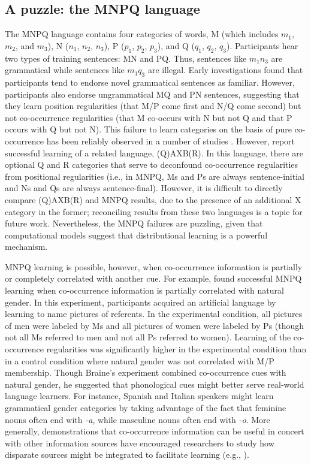 \documentclass[man,floatsintext]{apa6}
\begin{document}
\subsection{A puzzle: the MNPQ language}

The MNPQ language contains four categories of words, M (which includes $m_1$, $m_2$, and $m_3$), N ($n_1$, $n_2$, $n_3$), P ($p_1$, $p_2$, $p_3$), and Q ($q_1$, $q_2$, $q_3$). Participants hear two types of training sentences: MN and PQ. Thus, sentences like $m_1 n_3$ are grammatical while sentences like $m_1 q_3$ are illegal. Early investigations \citep{braine1966, smith1966} found that participants tend to endorse novel grammatical sentences as familiar. However, participants also endorse ungrammatical MQ and PN sentences, suggesting that they learn position regularities (that M/P come first and N/Q come second) but not co-occurrence regularities (that M co-occurs with N but not Q and that P occurs with Q but not N). This failure to learn categories on the basis of pure co-occurrence has been reliably observed in a number of studies \citep{braine1987, brooks1993, frigo1998, kempe2001, gerken2005, lany2010, frank2011}. However, \citet[Experiment 5]{reeder2009} report successful learning of a related language, (Q)AXB(R). In this language, there are optional Q and R categories that serve to deconfound co-occurrence regularities from positional regularities (i.e., in MNPQ, Ms and Ps are always sentence-initial and Ns and Qs are always sentence-final). However, it is difficult to directly compare (Q)AXB(R) and MNPQ results, due to the presence of an additional X category in the former; reconciling results from these two languages is a topic for future work. Nevertheless, the MNPQ failures are puzzling, given that computational models suggest that distributional learning is a powerful mechanism.

MNPQ learning is possible, however, when co-occurrence information is partially or completely correlated with another cue. For example, \citet{braine1987} found successful MNPQ learning when co-occurrence information is partially correlated with natural gender. In this experiment, participants acquired an artificial language by learning to name pictures of referents. In the experimental condition, all pictures of men were labeled by Ms and all pictures of women were labeled by Ps (though not all Ms referred to men and not all Ps referred to women). Learning of the co-occurrence regularities was significantly higher in the experimental condition than in a control condition where natural gender was not correlated with M/P membership. Though Braine's experiment combined co-occurrence cues with natural gender, he suggested that phonological cues might better serve real-world language learners. For instance, Spanish and Italian speakers might learn grammatical gender categories by taking advantage of the fact that feminine nouns often end with \emph{-a}, while masculine nouns often end with \emph{-o}. More generally, demonstrations that co-occurrence information can be useful in concert with other information sources have encouraged researchers to study how disparate sources might be integrated to facilitate learning (e.g., \citealp{monaghan2005, johns2012}).
\end{document}
